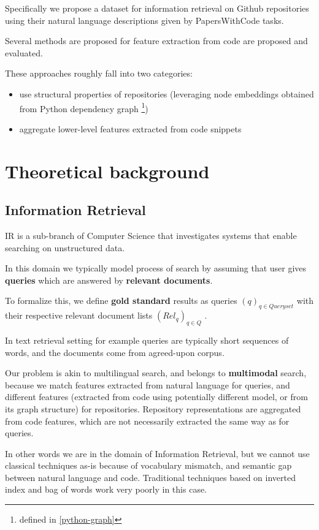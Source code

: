 \documentclass[11pt]{report}
\begin{document}
Specifically we propose a dataset for information retrieval on Github repositories using their natural language descriptions given by PapersWithCode tasks.

Several methods are proposed for feature extraction from code are proposed and evaluated.

These approaches roughly fall into two categories:
\begin{itemize}
\item use structural properties of repositories (leveraging node embeddings obtained from Python dependency graph \footnote{defined in \ref{python-graph}})
\item aggregate lower-level features extracted from code snippets
\end{itemize}


\chapter{Theoretical background}


\section{Information Retrieval}


IR is a sub-branch of Computer Science that investigates systems that enable searching on unstructured data.

In this domain we typically model process of search by assuming that user gives \textbf{\textbf{queries}} which are answered by \textbf{\textbf{relevant documents}}.

To formalize this, we define \textbf{gold standard} results as queries \((q)_{q \in Queryset}\) with their respective relevant document lists \((Rel_q)_{q \in Q}\) .

In text retrieval setting for example queries are typically short sequences of words, and the documents come from agreed-upon corpus.

Our problem is akin to multilingual search, and belongs to \textbf{multimodal} search, because we match features extracted from natural language for queries, and different features (extracted from code using potentially different model, or from its graph structure) for repositories. Repository representations are aggregated from code features, which are not necessarily extracted the same way as for queries.

In other words we are in the domain of Information Retrieval, but we cannot use classical techniques as-is because of vocabulary mismatch, and semantic gap between natural language and code. Traditional techniques based on inverted index and bag of words work very poorly in this case.
\end{document}
